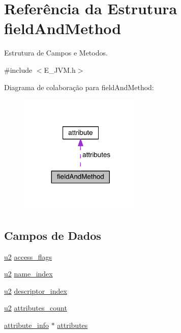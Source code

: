 \hypertarget{structfield_and_method}{}\section{Referência da Estrutura field\+And\+Method}
\label{structfield_and_method}


Estrutura de Campos e Metodos.  




{\ttfamily \#include $<$E\+\_\+\+J\+V\+M.\+h$>$}



Diagrama de colaboração para field\+And\+Method\+:\nopagebreak
\begin{figure}[H]
\begin{center}
\leavevmode
\includegraphics[width=167pt]{structfield_and_method__coll__graph}
\end{center}
\end{figure}
\subsection*{Campos de Dados}
\begin{DoxyCompactItemize}
\item 
\hyperlink{_e___j_v_m_8h_a5f223212eef04d10a4550ded680cb1cf}{u2} \hyperlink{structfield_and_method_a04b1604b7553b064887cc578d441d7aa}{access\+\_\+flags}
\item 
\hyperlink{_e___j_v_m_8h_a5f223212eef04d10a4550ded680cb1cf}{u2} \hyperlink{structfield_and_method_ac636d7076db5a2ce9891613be8ad9b00}{name\+\_\+index}
\item 
\hyperlink{_e___j_v_m_8h_a5f223212eef04d10a4550ded680cb1cf}{u2} \hyperlink{structfield_and_method_a61c33b04e96966edbfd142eea9992834}{descriptor\+\_\+index}
\item 
\hyperlink{_e___j_v_m_8h_a5f223212eef04d10a4550ded680cb1cf}{u2} \hyperlink{structfield_and_method_a0b45411cd7a3167fdcfad1af18a799e5}{attributes\+\_\+count}
\item 
\hyperlink{_e___j_v_m_8h_a4c2796d61bb99bf730b1807fc838c847}{attribute\+\_\+info} $\ast$ \hyperlink{structfield_and_method_ad7062d512c3653c46dfa1fb6acf07396}{attributes}
\end{DoxyCompactItemize}


